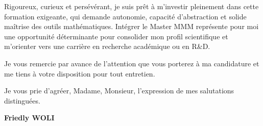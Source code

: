\documentclass[11pt,a4paper]{article}
\begin{document}
Rigoureux, curieux et persévérant, je suis prêt à m’investir pleinement dans cette formation exigeante, qui demande autonomie, capacité d’abstraction et solide maîtrise des outils mathématiques. Intégrer le Master MMM représente pour moi une opportunité déterminante pour consolider mon profil scientifique et m’orienter vers une carrière en recherche académique ou en R\&D.

Je vous remercie par avance de l’attention que vous porterez à ma candidature et me tiens à votre disposition pour tout entretien.

Je vous prie d’agréer, Madame, Monsieur, l’expression de mes salutations distinguées.



	

	
	
	
	\vspace{0.8cm}
	
	
	
	
	
	
	\begin{flushright}
		
		\textbf{Friedly WOLI}
	\end{flushright}
	
	
\end{document}

